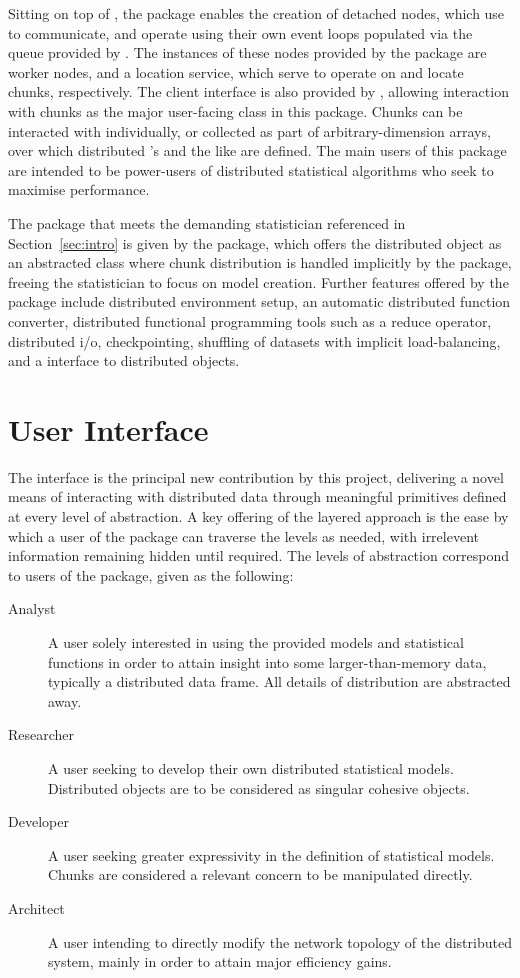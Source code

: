 \documentclass[letterpaper, inpress]{jds} %
\begin{document}
Sitting on top of , the package  enables the creation of detached nodes, which use  to communicate, and operate using their own event loops populated via the queue provided by .
The instances of these nodes provided by the package are worker nodes, and a location service, which serve to operate on and locate chunks, respectively.
The client interface is also provided by , allowing interaction with chunks as the major user-facing class in this package.
Chunks can be interacted with individually, or collected as part of arbitrary-dimension arrays, over which distributed 's and the like are defined.
The main users of this package are intended to be power-users of distributed statistical algorithms who seek to maximise performance.

The package that meets the demanding statistician referenced in Section~\ref{sec:intro} is given by the  package, which offers the distributed object as an abstracted class where chunk distribution is handled implicitly by the package, freeing the statistician to focus on model creation. Further features offered by the package include distributed environment setup, an automatic distributed function converter, distributed functional programming tools such as a reduce operator, distributed i/o, checkpointing, shuffling of datasets with implicit load-balancing, and a  interface to distributed objects.

\section{User Interface}

The  interface is the principal new contribution by this project, delivering a novel means of interacting with distributed data through meaningful primitives defined at every level of abstraction.
A key offering of the layered approach is the ease by which a user of the package can traverse the levels as needed, with irrelevent information remaining hidden until required.
The levels of abstraction correspond to users of the package, given as the following:

\begin{description}
    \item[Analyst] A user solely interested in using the provided models and statistical functions in order to attain insight into some larger-than-memory data, typically a distributed data frame. All details of distribution are abstracted away.
    \item[Researcher] A user seeking to develop their own distributed statistical models. Distributed objects are to be considered as singular cohesive objects.
    \item[Developer] A user seeking greater expressivity in the definition of statistical models. Chunks are considered a relevant concern to be manipulated directly.
    \item[Architect] A user intending to directly modify the network topology of the distributed system, mainly in order to attain major efficiency gains.
\end{description}
\end{document}
